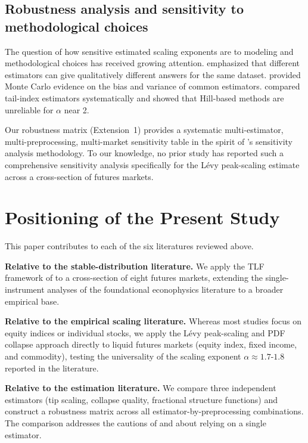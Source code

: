 \documentclass[12pt,a4paper]{article}
\begin{document}
\subsection{Robustness analysis and sensitivity to methodological choices}

The question of how sensitive estimated scaling exponents are to modeling
and methodological choices has received growing attention. \textcite{Cont2001}
emphasized that different estimators can give qualitatively different answers
for the same dataset. \textcite{Weron2001} provided Monte Carlo evidence on the
bias and variance of common estimators. \textcite{Barunik2010} compared
tail-index estimators systematically and showed that Hill-based methods
are unreliable for $\alpha$ near 2.

Our robustness matrix (Extension~1) provides a systematic multi-estimator,
multi-preprocessing, multi-market sensitivity table in the spirit of
\textcite{Sala-i-Martin1997}'s sensitivity analysis methodology. To our
knowledge, no prior study has reported such a comprehensive sensitivity analysis
specifically for the Lévy peak-scaling estimate across a cross-section of
futures markets.


\section{Positioning of the Present Study}
\label{sec:position}

This paper contributes to each of the six literatures reviewed above.

\textbf{Relative to the stable-distribution literature.} We apply the
TLF framework of \textcite{MantegnaStanley1994,MantegnaStanley1995} to a
cross-section of eight futures markets, extending the single-instrument analyses
of the foundational econophysics literature to a broader empirical base.

\textbf{Relative to the empirical scaling literature.} Whereas most
studies focus on equity indices or individual stocks, we apply the Lévy
peak-scaling and PDF collapse approach directly to liquid futures markets
(equity index, fixed income, and commodity), testing the universality of
the scaling exponent $\alpha \approx 1.7$-$1.8$ reported in the literature.

\textbf{Relative to the estimation literature.} We compare three
independent estimators (tip scaling, collapse quality, fractional structure
functions) and construct a robustness matrix across all estimator-by-preprocessing
combinations. The comparison addresses the cautions of \textcite{Weron2001}
and \textcite{Barunik2010} about relying on a single estimator.
\end{document}
